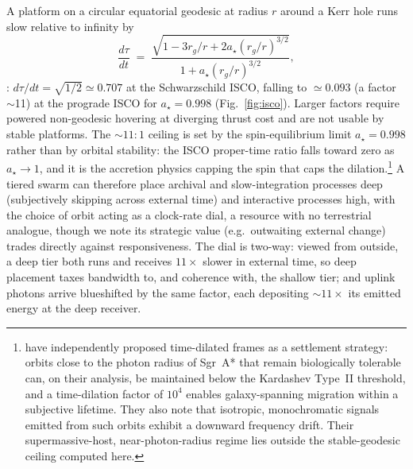 \documentclass[11pt]{article}
\newcommand{\astar}{\ensuremath{a_\star}}
\begin{document}
A platform on a circular equatorial geodesic at radius $r$ around a Kerr hole runs slow relative to infinity by
\begin{equation}
\frac{d\tau}{dt} \;=\; \frac{\sqrt{1 - 3r_g/r + 2\astar (r_g/r)^{3/2}}}{1 + \astar (r_g/r)^{3/2}},
\label{eq:dilation}
\end{equation}
\citep{BardeenPressTeukolsky1972}: $d\tau/dt = \sqrt{1/2} \simeq 0.707$ at the Schwarzschild ISCO, falling to $\simeq 0.093$ (a factor $\sim$11) at the prograde ISCO for $\astar = 0.998$ (Fig.~\ref{fig:isco}). Larger factors require powered non-geodesic hovering at diverging thrust cost and are not usable by stable platforms. The $\sim$$11{:}1$ ceiling is set by the \citet{Thorne1974} spin-equilibrium limit $\astar = 0.998$ rather than by orbital stability: the ISCO proper-time ratio falls toward zero as $\astar \to 1$, and it is the accretion physics capping the spin that caps the dilation.\footnote{\citet{ReissFeng2026} have independently proposed time-dilated frames as a settlement strategy: orbits close to the photon radius of Sgr~A* that remain biologically tolerable can, on their analysis, be maintained below the Kardashev Type~II threshold, and a time-dilation factor of $10^{4}$ enables galaxy-spanning migration within a subjective lifetime. They also note that isotropic, monochromatic signals emitted from such orbits exhibit a downward frequency drift. Their supermassive-host, near-photon-radius regime lies outside the stable-geodesic ceiling computed here.} A tiered swarm can therefore place archival and slow-integration processes deep (subjectively skipping across external time) and interactive processes high, with the choice of orbit acting as a clock-rate dial, a resource with no terrestrial analogue, though we note its strategic value (e.g.\ outwaiting external change) trades directly against responsiveness. The dial is two-way: viewed from outside, a deep tier both runs and receives $11\times$ slower in external time, so deep placement taxes bandwidth to, and coherence with, the shallow tier; and uplink photons arrive blueshifted by the same factor, each depositing $\sim$$11\times$ its emitted energy at the deep receiver.
\end{document}
